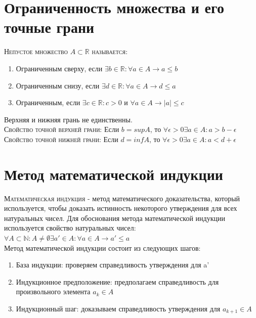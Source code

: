 \documentclass[14pt]{article}
\begin{document}
    \section{Ограниченность множества и его точные грани}  
        \textsc{Непустое множество $A \subset \mathbb{R}$ называется:} \\
        \begin{enumerate}
            \item Ограниченным сверху, если $\exists b \in \mathbb{R}: \forall a \in A \rightarrow a \leqslant  b$
            \item Ограниченным снизу, если $\exists d \in \mathbb{R}: \forall a \in A \rightarrow d \leqslant  a$
            \item Ограниченным, если $\exists c \in \mathbb{R}: c>0$ и $\forall a \in A \rightarrow |a| \leqslant c$
        \end{enumerate}
        Верхняя и нижняя грань не единственны. \\
        \textsc{Свойство точной верхней грани:} Если $b = sup A $, то $\forall \epsilon > 0 \exists a \in A: a > b - \epsilon$ \\
        \textsc{Свойство точной нижней грани:} Если $d = inf A $, то $\forall \epsilon > 0 \exists a \in A: a < d + \epsilon$

    \section{Метод математической индукции}
        \textsc{Математическая индукция } - метод математического доказательства, который используется, чтобы доказать истинность некоторого утверждения для всех натуральных чисел.
        Для обоснования метода математической индукции используется свойство натуральных чисел:  $\forall A \subset \mathbb{N}: A \ne \emptyset \exists a' \in A : \forall a \in A \rightarrow a' \leqslant a$ \\ 

        Метод математической индукции состоит из следующих шагов:
        \begin{enumerate}
            \item База индукции: проверяем справедливость утверждения для a'
            \item Индукционное предположение: предполагаем справедливость для произвольного элемента $a_k \in A$
            \item Индукционный шаг: доказываем справедливость утверждения для $a_{k+1} \in A$
        \end{enumerate}
\end{document}
